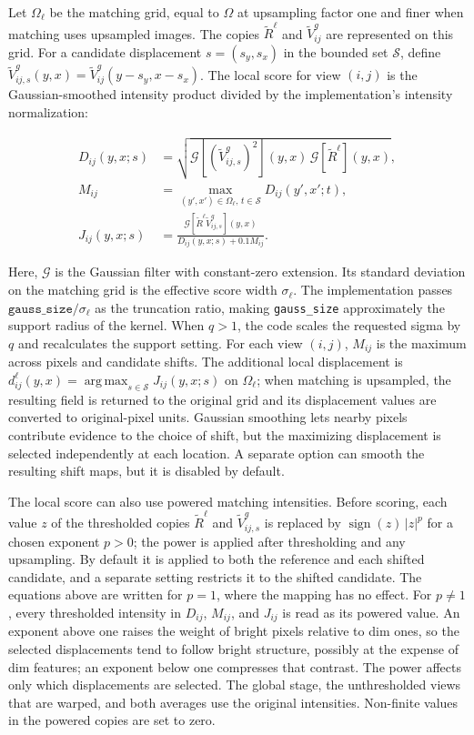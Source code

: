 Let $\Omega_\ell$ be the matching grid, equal to $\Omega$ at upsampling factor one and finer when matching uses upsampled images. The copies $\widetilde R^\ell$ and $\widetilde V^g_{ij}$ are represented on this grid. For a candidate displacement $s=(s_y,s_x)$ in the bounded set $\mathcal S$, define $\widetilde V^g_{ij,s}(y,x)=\widetilde V^g_{ij}(y-s_y,x-s_x)$. The local score for view $(i,j)$ is the Gaussian-smoothed intensity product divided by the implementation's intensity normalization:

\begin{align}
    D_{ij}(y,x;s)&=\sqrt{\mathcal G[(\widetilde V^g_{ij,s})^2](y,x)\,\mathcal G[\widetilde R^\ell](y,x)},\\
    M_{ij}&=\max_{(y',x')\in\Omega_\ell,\,t\in\mathcal S}D_{ij}(y',x';t),\\
    J_{ij}(y,x;s)&=\frac{\mathcal G[\widetilde R^\ell\widetilde V^g_{ij,s}](y,x)}{D_{ij}(y,x;s)+0.1M_{ij}}.
\end{align}

Here, $\mathcal G$ is the Gaussian filter with constant-zero extension. Its standard deviation on the matching grid is the effective score width $\sigma_\ell$.
The implementation passes $\texttt{gauss\_size}/\sigma_\ell$ as the truncation ratio, making \texttt{gauss\_size} approximately the support radius of the kernel.
When $q>1$, the code scales the requested sigma by $q$ and recalculates the support setting.
For each view $(i,j)$, $M_{ij}$ is the maximum across pixels and candidate shifts. The additional local displacement is $d^\ell_{ij}(y,x)=\operatorname*{arg\,max}_{s\in\mathcal S}J_{ij}(y,x;s)$ on $\Omega_\ell$; when matching is upsampled, the resulting field is returned to the original grid and its displacement values are converted to original-pixel units.
Gaussian smoothing lets nearby pixels contribute evidence
to the choice of shift, but the maximizing displacement is selected
independently at each location. A separate option can smooth the resulting
shift maps, but it is disabled by default.

The local score can also use powered matching intensities. Before scoring, each value $z$ of the thresholded copies $\widetilde R^\ell$ and $\widetilde V^g_{ij,s}$ is replaced by $\operatorname{sign}(z)\,|z|^{p}$ for a chosen exponent $p>0$; the power is applied after thresholding and any upsampling. By default it is applied to both the reference and each shifted candidate, and a separate setting restricts it to the shifted candidate. The equations above are written for $p=1$, where the mapping has no effect. For $p\neq1$, every thresholded intensity in $D_{ij}$, $M_{ij}$, and $J_{ij}$ is read as its powered value. An exponent above one raises the weight of bright pixels relative to dim ones, so the selected displacements tend to follow bright structure, possibly at the expense of dim features; an exponent below one compresses that contrast. The power affects only which displacements are selected. The global stage, the unthresholded views that are warped, and both averages use the original intensities. Non-finite values in the powered copies are set to zero.


